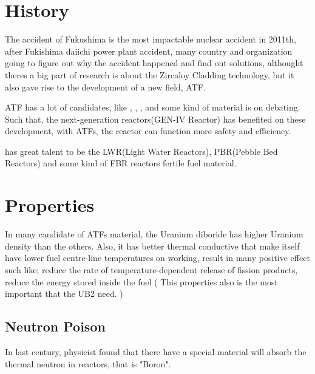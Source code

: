 \documentclass[final,10pt,times,twocolumn]{elsarticle}
\begin{document}
\section{History}
The accident of Fukushima is the most impactable nuclear accident in 2011th, after Fukishima daiichi power plant accident, many country and organization going to figure out why the accident happened and find out solutions, althought theres a big part of research is about the Zircaloy Cladding technology, but it also gave rise to the development of a new field, ATF.

ATF has a lot of candidates, like , , ,  and some kind of material is on debating. Such that, the next-generation reactors(GEN-IV Reactor) has benefited on these development, with ATFs, the reactor can function more safety and efficiency.

 has great talent to be the LWR(Light Water Reactors), PBR(Pebble Bed Reactors) and some kind of FBR reactors fertile fuel material.

\section{Properties}
In many candidate of ATFs material, the Uranium diboride has higher Uranium density than the others. Also, it has better thermal conductive that make itself have lower fuel centre-line temperatures on working, result in many positive effect such like; reduce the rate of temperature-dependent release of fission products, reduce the energy stored inside the fuel ( This properties also is the most important that the UB2 need. )

\subsection{Neutron Poison}
In last century, physicist found that there have a special material will absorb the thermal neutron in reactors, that is "Boron". 
\end{document}

